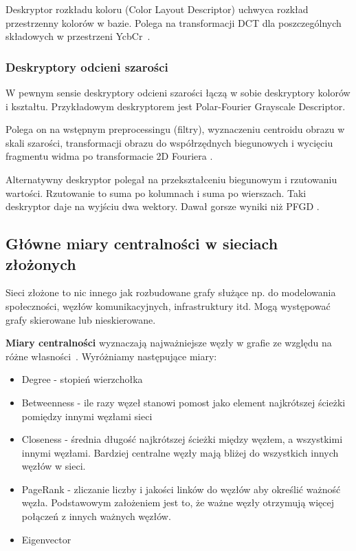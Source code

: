 \documentclass[wi]{zut}
\begin{document}
Deskryptor rozkładu koloru (Color Layout Descriptor) uchwyca rozkład przestrzenny kolorów w bazie. Polega na transformacji DCT dla poszczególnych składowych w przestrzeni YcbCr~\cite{Frejlichowski2020_6}.

\subsubsection{Deskryptory odcieni szarości}

W pewnym sensie deskryptory odcieni szarości łączą w sobie deskryptory kolorów i kształtu. Przykładowym deskryptorem jest Polar-Fourier Grayscale Descriptor.

Polega on na wstępnym preprocessingu (filtry), wyznaczeniu centroidu obrazu w skali szarości, transformacji obrazu do współrzędnych biegunowych i wycięciu fragmentu widma po transformacie 2D Fouriera \cite{frejlichowski2015application}.

Alternatywny deskryptor polegał na przekształceniu biegunowym i rzutowaniu wartości. Rzutowanie to suma po kolumnach i suma po wierszach. Taki deskryptor daje na wyjściu dwa wektory. Dawał gorsze wyniki niż PFGD \cite{Frejlichowski2020_5}.


\subsection{Główne miary centralności w sieciach złożonych}

Sieci złożone to nic innego jak rozbudowane grafy służące np. do modelowania społeczności, węzłów komunikacyjnych, infrastruktury itd. Mogą występować grafy skierowane lub nieskierowane.

\textbf{Miary centralności} wyznaczają najważniejsze węzły w grafie ze względu na różne własności~\cite{Jankowski2020}. Wyróżniamy następujące miary:

\begin{itemize}
    \item Degree - stopień wierzchołka
    \item Betweenness - ile razy węzeł stanowi pomost jako element najkrótszej ścieżki pomiędzy innymi węzłami sieci
    \item Closeness - średnia długość najkrótszej ścieżki między węzłem, a wszystkimi innymi węzłami. Bardziej centralne węzły mają bliżej do wszystkich innych węzłów w sieci.
    \item PageRank - zliczanie liczby i jakości linków do węzłów aby określić ważność węzła. Podstawowym założeniem jest to, że ważne węzły otrzymują więcej połączeń z innych ważnych węzłów.
    \item Eigenvector
\end{itemize}
\end{document}
